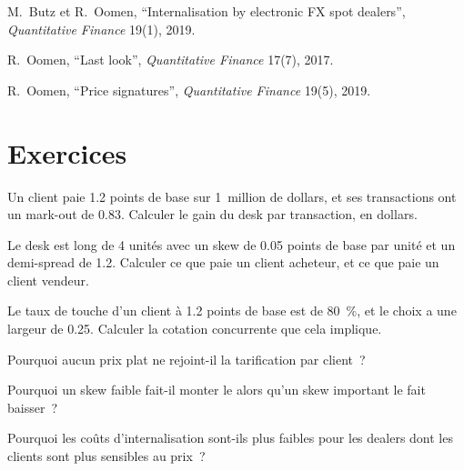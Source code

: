 \begin{omsources}
\item M.~Butz et R.~Oomen, ``Internalisation by electronic FX spot dealers'', \emph{Quantitative Finance} 19(1), 2019.
\item R.~Oomen, ``Last look'', \emph{Quantitative Finance} 17(7), 2017.
\item R.~Oomen, ``Price signatures'', \emph{Quantitative Finance} 19(5), 2019.
\end{omsources}

\section{Exercices}

\begin{exercise}[$\star$]\label{exo:s2:flow-market-making-at-a-bank:1}
Un client paie 1.2 points de base sur 1~million de dollars, et ses transactions ont un mark-out de 0.83. Calculer le gain du desk par transaction, en dollars.
\end{exercise}

\begin{exercise}[$\star$]\label{exo:s2:flow-market-making-at-a-bank:2}
Le desk est long de 4 unités avec un skew de 0.05 points de base par unité et un demi-spread de 1.2. Calculer ce que paie un client acheteur, et ce que paie un client vendeur.
\end{exercise}

\begin{exercise}[$\star$]\label{exo:s2:flow-market-making-at-a-bank:3}
Le taux de touche d'un client à 1.2 points de base est de 80~\%, et le choix a une largeur de 0.25. Calculer la cotation concurrente que cela implique.
\end{exercise}

\begin{exercise}[$\star\star$]\label{exo:s2:flow-market-making-at-a-bank:4}
Pourquoi aucun prix plat ne rejoint-il la tarification par client~?
\end{exercise}

\begin{exercise}[$\star\star$]\label{exo:s2:flow-market-making-at-a-bank:5}
Pourquoi un skew faible fait-il monter le  alors qu'un skew important le fait baisser~?
\end{exercise}

\begin{exercise}[$\star\star$]\label{exo:s2:flow-market-making-at-a-bank:6}
Pourquoi les coûts d'internalisation sont-ils plus faibles pour les dealers dont les clients sont plus sensibles au prix~?
\end{exercise}

